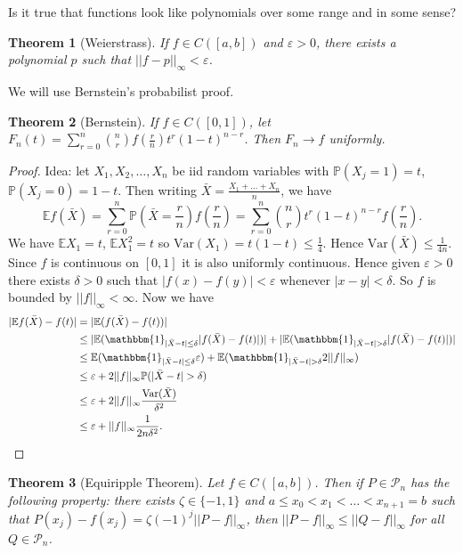 \documentclass[a4paper, 10pt, twocolumn]{amsart}
\newtheorem*{theorem}{Theorem}
\theoremstyle{definition}
\newcommand{\bb}[1]{\mathbb{#1}}
\newcommand{\eps}[0]{\varepsilon}
\renewcommand{\cal}[1]{\mathcal{#1}}
\newcommand{\1}{\mathbbm{1}}
\newcommand{\Var}[0]{\text{Var}}
\begin{document}
Is it true that functions look like polynomials over some range and in some sense? 

\begin{theorem}[Weierstrass]
    If $f \in C([a,b])$ and $\eps>0$, there exists a polynomial $p$ such that $||f-p||_{\infty} < \eps$. 
\end{theorem}

We will use Bernstein's probabilist proof. 

\begin{theorem}[Bernstein]
    If $f \in C([0,1])$, let $F_n(t) = \sum_{r=0}^n \binom{n}{r} f\left(\frac{r}{n}\right)t^r (1-t)^{n-r}$. Then $F_n \to f$ uniformly.
\end{theorem}

\begin{proof}
    Idea: let $X_1,X_2,\ldots,X_n$ be iid random variables with $\bb{P}(X_j=1) = t$, $\bb{P}(X_j=0) = 1-t$. Then writing $\bar{X} = \frac{X_1+\ldots+X_n}{n}$, we have \[\bb{E}f(\bar{X}) = \sum_{r=0}^n \bb{P}\left(\bar{X}=\frac{r}{n}\right) f\left(\frac{r}{n} \right) = \sum_{r=0}^n \binom{n}{r} t^r(1-t)^{n-r} f\left(\frac{r}{n}\right).\]
    We have $\bb{E}X_1 = t$, $\bb{E}X_1^2= t$ so $\Var(X_1) = t(1-t) \le \frac{1}{4}$. Hence $\Var(\bar{X}) \le \frac{1}{4n}$. Since $f$ is continuous on $[0,1]$ it is also uniformly continuous. Hence given $\eps>0$ there exists $\delta>0$ such that $|f(x)-f(y)|<\eps$ whenever $|x-y|<\delta$. So $f$ is bounded by $||f||_\infty < \infty$. Now we have \begin{align*}
        |\bb{E}f(\bar{X})-f(t)|&= |\bb{E}(f(\bar{X})-f(t))|\\
        & \le |\bb{E}(\1_{|\bar{X}-t|\le \delta}|f(\bar{X})-f(t)|)| + |\bb{E}(\1_{|\bar{X}-t|>\delta}|f(\bar{X})-f(t)|)|\\
        & \le \bb{E}(\1_{|\bar{X}-t| \le \delta }\eps) + \bb{E} (\1_{|\bar{X}-t|>\delta} 2||f||_\infty)\\
        & \le \eps + 2||f||_\infty \bb{P}(|\bar{X}-t|>\delta)\\
        &\le \eps + 2||f||_\infty \frac{\Var(\bar{X})}{\delta^2}\\
        & \le \eps + ||f||_\infty \frac{1}{2n\delta^2}.
    \end{align*}
\end{proof}





\begin{theorem}[Equiripple Theorem]
    Let $f \in C([a,b])$. Then if $P \in \cal{P}_n$ has the following property: there exists $\zeta \in \{-1,1\}$ and $a\le x_0<x_1<\ldots<x_{n+1}=b$ such that $P(x_j)-f(x_j) = \zeta (-1)^j ||P-f||_\infty$, then $||P-f||_\infty \le ||Q-f||_\infty$ for all $Q \in \cal{P}_n$. 
\end{theorem}
\end{document}
